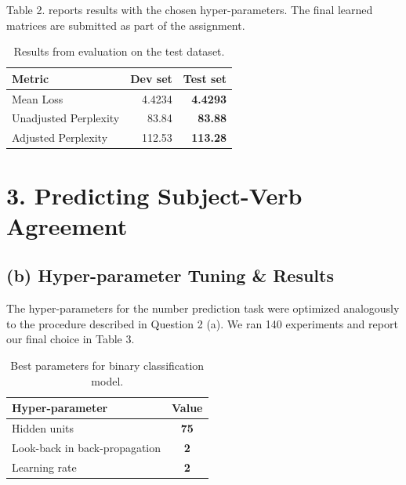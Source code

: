 \documentclass{article}
\begin{document}
Table 2. reports results with the chosen hyper-parameters. The final learned matrices are submitted as part of the assignment.


\begin{table}[h!]
\begin{center}
\begin{scriptsize}
\begin{tabular}{lrr}
\hline
\abovespace\belowspace
Metric & Dev set & Test set \\
\hline
\abovespace
Mean Loss &  4.4234 & \textbf{4.4293} \\
Unadjusted Perplexity & 83.84 & \textbf{83.88} \\
\belowspace	
Adjusted Perplexity & 112.53 & \textbf{113.28} \\
\hline
\end{tabular}
\end{scriptsize}
\caption{Results from evaluation on the test dataset.}
\end{center}
\end{table}


\section*{3. Predicting Subject-Verb Agreement}

\subsection*{(b) Hyper-parameter Tuning  \& Results}
The hyper-parameters for the number prediction task were optimized analogously to the procedure described in Question 2 (a). We ran 140 experiments and report our final choice in Table 3.

\begin{table}[h]
\begin{center}
\begin{scriptsize}
\begin{tabular}{lc}
\hline
\abovespace\belowspace
Hyper-parameter & Value \\
\hline
\abovespace
Hidden units &  \textbf{75} \\
Look-back in back-propagation &  \textbf{2} \\
\belowspace
Learning rate & \textbf{2} \\
\hline
\end{tabular}
\end{scriptsize}
\caption{Best parameters for binary classification model.}
\end{center}
\end{table}
\end{document}
